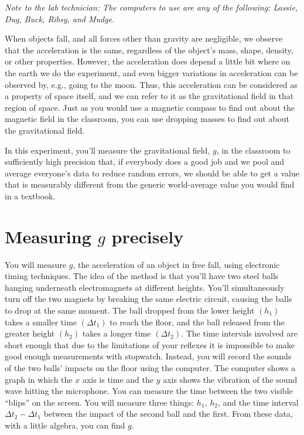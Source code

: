 \label{lab:g}

\emph{Note to the lab technician: The computers to use are any of the following:
Lassie, Dug, Buck, Ribsy, and Mudge.}

\apparatus
{}


\introduction
When objects fall, and all forces other than gravity are negligible,
we observe that the acceleration is the same, regardless of the object's
mass, shape, density, or other properties. However, the acceleration does
depend a little bit where on the earth we do the experiment, and even bigger
variations in acceleration can be observed by, e.g., going to the moon.
Thus, this acceleration can be considered as a property of space itself,
and we can refer to it as the gravitational field in that region of space.
Just as you would use a magnetic compass to find out about the magnetic field
in the classroom, you can use dropping masses to find out about the gravitational
field.

In this experiment, you'll measure the gravitational field, $g$, in the
classroom to sufficiently high precision that, if everybody does a good job and
we pool and average everyone's data to reduce random errors, we should be able to
get a value that is measurably different from the generic world-average value you
would find in a textbook.

\section*{Measuring $g$ precisely}
You will measure $g$, the
acceleration of an object in free fall, using electronic
timing techniques. The idea of the method is that you'll
have two steel balls hanging underneath electromagnets at
different heights. You'll simultaneously turn off the two
magnets by breaking the same electric circuit, causing the balls to drop at
the same moment. The ball dropped from the lower height
$(h_1)$ takes a smaller time $(\Delta t_1)$ to reach the floor, and
the ball released from the greater height $(h_2)$ takes a
longer time $(\Delta t_2)$. The time intervals involved are short
enough that due to the limitations of your reflexes it is
impossible to make good enough measurements with stopwatch. 
Instead, you will record the sounds of the two balls'
impacts on the floor using the computer.  The computer
shows a graph in which the $x$ axis is time and the $y$ axis
shows the vibration of the sound wave hitting the microphone.
You can measure the time between the two visible ``blips''
on the screen.  You will measure three things: $h_1$, $h_2$,
and the time interval $\Delta t_2-\Delta t_1$ between the impact of the
second ball and the first.  From these data, with a little
algebra, you can find $g$.

